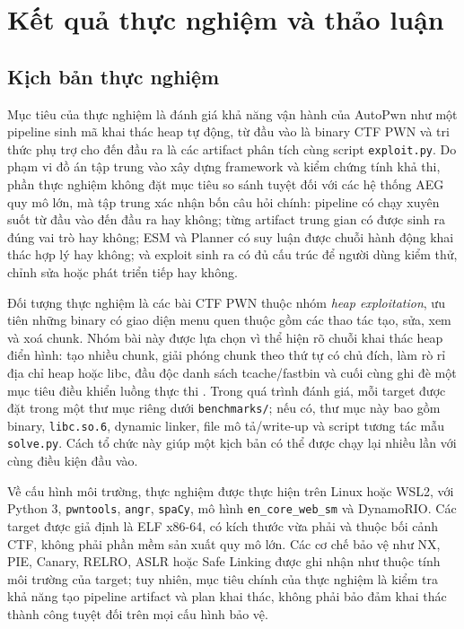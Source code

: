 \documentclass[final]{hcmuitthesis}
\begin{document}
\section{Kết quả thực nghiệm và thảo luận}

\subsection{Kịch bản thực nghiệm}
Mục tiêu của thực nghiệm là đánh giá khả năng vận hành của AutoPwn như một pipeline sinh mã khai thác heap tự động, từ đầu vào là binary CTF PWN và tri thức phụ trợ cho đến đầu ra là các artifact phân tích cùng script \texttt{exploit.py}. Do phạm vi đồ án tập trung vào xây dựng framework và kiểm chứng tính khả thi, phần thực nghiệm không đặt mục tiêu so sánh tuyệt đối với các hệ thống AEG quy mô lớn, mà tập trung xác nhận bốn câu hỏi chính: pipeline có chạy xuyên suốt từ đầu vào đến đầu ra hay không; từng artifact trung gian có được sinh ra đúng vai trò hay không; ESM và Planner có suy luận được chuỗi hành động khai thác hợp lý hay không; và exploit sinh ra có đủ cấu trúc để người dùng kiểm thử, chỉnh sửa hoặc phát triển tiếp hay không.

Đối tượng thực nghiệm là các bài CTF PWN thuộc nhóm \textit{heap exploitation}, ưu tiên những binary có giao diện menu quen thuộc gồm các thao tác tạo, sửa, xem và xoá chunk. Nhóm bài này được lựa chọn vì thể hiện rõ chuỗi khai thác heap điển hình: tạo nhiều chunk, giải phóng chunk theo thứ tự có chủ đích, làm rò rỉ địa chỉ heap hoặc libc, đầu độc danh sách tcache/fastbin và cuối cùng ghi đè một mục tiêu điều khiển luồng thực thi \cite{ctfwikiheap,glibc2025}. Trong quá trình đánh giá, mỗi target được đặt trong một thư mục riêng dưới \texttt{benchmarks/}; nếu có, thư mục này bao gồm binary, \texttt{libc.so.6}, dynamic linker, file mô tả/write-up và script tương tác mẫu \texttt{solve.py}. Cách tổ chức này giúp một kịch bản có thể được chạy lại nhiều lần với cùng điều kiện đầu vào.

Về cấu hình môi trường, thực nghiệm được thực hiện trên Linux hoặc WSL2, với Python 3, \texttt{pwntools}, \texttt{angr}, \texttt{spaCy}, mô hình \texttt{en\_core\_web\_sm} và DynamoRIO. Các target được giả định là ELF x86-64, có kích thước vừa phải và thuộc bối cảnh CTF, không phải phần mềm sản xuất quy mô lớn. Các cơ chế bảo vệ như NX, PIE, Canary, RELRO, ASLR hoặc Safe Linking được ghi nhận như thuộc tính môi trường của target; tuy nhiên, mục tiêu chính của thực nghiệm là kiểm tra khả năng tạo pipeline artifact và plan khai thác, không phải bảo đảm khai thác thành công tuyệt đối trên mọi cấu hình bảo vệ.
\end{document}
